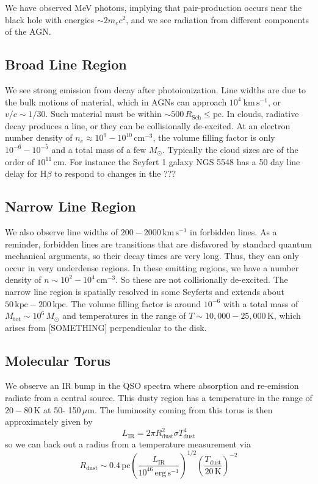 \documentclass[10pt]{article}
\numberwithin{equation}{section}
\newcommand{\n}{\noindent}
\begin{document}
	\n We have observed MeV photons, implying that pair-production occurs near the black hole with energies $\sim 2m_ec^2$, and we see radiation from different components of the AGN.
	
	\subsection{Broad Line Region} %
	\label{sub:broad_line_region}
	We see strong emission from decay after photoionization. Line widths are due to the bulk motions of material, which in AGNs can approach $10^4\ \mathrm{km\,s^{-1}}$, or $v/c\sim 1/30$. Such material must be within $\sim 500\,R_{\mathrm{Sch}}\leq \mathrm{pc}$. In clouds, radiative decay produces a line, or they can be collisionally de-excited. At an electron number density of $n_e \approx 10^9-10^{10}\,\mathrm{cm^{-3}}$, the volume filling factor is only $10^{-6}-10^{-5}$ and a total mass of a few $M_\odot$. Typically the cloud sizes are of the order of $10^{11}\,\mathrm{cm}$. For instance the Seyfert 1 galaxy NGS 5548 has a 50 day line delay for H$\beta$ to respond to changes in the ???
	\subsection{Narrow Line Region} %
	\label{sub:narrow_line_region}
	We also observe line widths of $200-2000\,\mathrm{km\,s^{-1}}$ in forbidden lines. As a reminder, forbidden lines are transitions that are disfavored by standard quantum mechanical arguments, so their decay times are very long. Thus, they can only occur in very underdense regions. In these emitting regions, we have a number density of $n\sim 10^2-10^4\,\mathrm{cm^{-3}}$. So these are not collisionally de-excited. The narrow line region is spatially resolved in some Seyferts and extends about $50\,\mathrm{kpc}-200\,\mathrm{kpc}$. The volume filling factor is around $10^{-6}$ with a total mass of $M_{\mathrm{tot}}\sim 10^6\,M_\odot$ and temperatures in the range of $T\sim 10,000-25,000\,\mathrm{K}$, which arises from [SOMETHING] perpendicular to the disk.
	\subsection{Molecular Torus} %
	\label{sub:molecular_torus}
	We observe an IR bump in the QSO spectra where absorption and re-emission radiate from a central source. This dusty region has a temperature in the range of $20-80\,\mathrm{K}$ at 50- 150\,$\mu$m. The luminosity coming from this torus is then approximately given by
	\begin{equation}
		\label{eq:torus:1} L_{\mathrm{IR}} = 2\pi R_{\mathrm{dust}}^2 \sigma T_{\mathrm{dust}}^4
	\end{equation}
	so we can back out a radius from a temperature measurement via
	\begin{equation}
		\label{eq:torus:2} R_{\mathrm{dust}} \sim 0.4\,\mathrm{pc}\left(\frac{L_{\mathrm{IR}}}{10^{46}\,\mathrm{erg\,s^{-1}}}\right)^{1/2}\left(\frac{T_{\mathrm{dust}}}{20\,\mathrm{K}}\right)^{-2}
	\end{equation}
\end{document}
